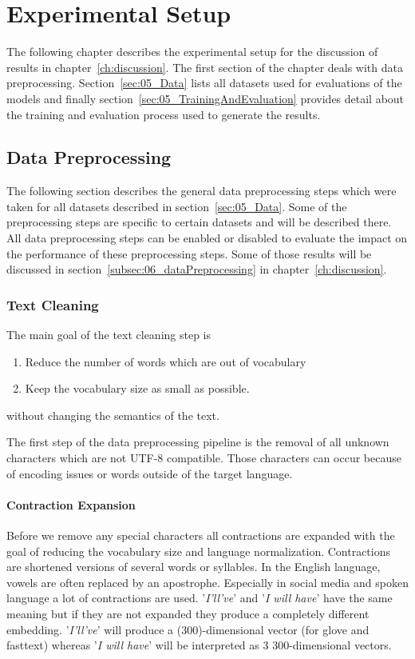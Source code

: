 \chapter{Experimental Setup}
\label{ch:setup}

The following chapter describes the experimental setup for the discussion of results in chapter~\ref{ch:discussion}. The first section of the chapter deals with data preprocessing. Section~\ref{sec:05_Data} lists all datasets used for evaluations of the models and finally section~\ref{sec:05_TrainingAndEvaluation} provides detail about the training and evaluation process used to generate the results.

\section{Data Preprocessing}
The following section describes the general data preprocessing steps which were taken for all datasets described in section~\ref{sec:05_Data}. Some of the preprocessing steps are specific to certain datasets and will be described there. All data preprocessing steps can be enabled or disabled to evaluate the impact on the performance of these preprocessing steps. Some of those results will be discussed in section~\ref{subsec:06_dataPreprocessing} in chapter~\ref{ch:discussion}.

\subsection{Text Cleaning}
The main goal of the text cleaning step is 
\begin{enumerate}
	\item Reduce the number of words which are out of vocabulary
	\item Keep the vocabulary size as small as possible.
\end{enumerate}

without changing the semantics of the text.


The first step of the data preprocessing pipeline is the removal of all unknown characters which are not UTF-8 compatible. Those characters can occur because of encoding issues or words outside of the target language. 
\subsubsection*{Contraction Expansion}

Before we remove any special characters all contractions are expanded with the goal of reducing the vocabulary size and language normalization. Contractions are shortened versions of several words or syllables. In the English language, vowels are often replaced by an apostrophe.  Especially in social media and spoken language a lot of contractions are used. '\textit{I'll've}' and '\textit{I will have}' have the same meaning but if they are not expanded they produce a completely different embedding. '\textit{I'll've}' will produce a (300)-dimensional vector (for glove and fasttext) whereas '\textit{I will have}' will be interpreted as 3 300-dimensional vectors.
\medskip

